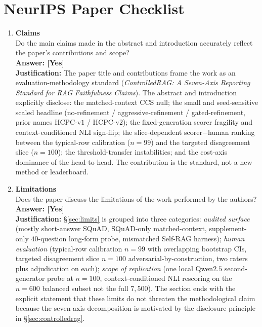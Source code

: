 %
%

\section*{NeurIPS Paper Checklist}

\begin{enumerate}

\item {\bf Claims}\\
Do the main claims made in the abstract and introduction accurately
reflect the paper's contributions and scope?
\\\textbf{Answer: [Yes]}
\\\textbf{Justification:} The paper title and contributions frame
the work as an evaluation-methodology standard
(\emph{ControlledRAG: A Seven-Axis Reporting Standard for RAG
Faithfulness Claims}). The abstract and introduction explicitly
disclose: the matched-context CCS null; the small and
seed-sensitive scaled headline (no-refinement /
aggressive-refinement / gated-refinement, prior names HCPC-v$1$ /
HCPC-v$2$); the fixed-generation scorer fragility and
context-conditioned NLI sign-flip; the slice-dependent
scorer$-$human ranking between the typical-row calibration
($n{=}99$) and the targeted disagreement slice ($n{=}100$); the
threshold-transfer instabilities; and the cost-axis dominance of
the head-to-head. The contribution is the standard, not a new
method or leaderboard.

\item {\bf Limitations}\\
Does the paper discuss the limitations of the work performed by the
authors?
\\\textbf{Answer: [Yes]}
\\\textbf{Justification:} \S\ref{sec:limits} is grouped into three
categories: \emph{audited surface} (mostly short-answer SQuAD,
SQuAD-only matched-context, supplement-only $40$-question long-form
probe, mismatched Self-RAG harness); \emph{human evaluation}
(typical-row calibration $n{=}99$ with overlapping bootstrap CIs,
targeted disagreement slice $n{=}100$ adversarial-by-construction,
two raters plus adjudication on each); \emph{scope of replication}
(one local Qwen$2.5$ second-generator probe at $n{=}100$,
context-conditioned NLI rescoring on the $n{=}600$ balanced subset
not the full $7{,}500$). The section ends with the explicit
statement that these limits do not threaten the methodological
claim because the seven-axis decomposition is motivated by the
disclosure principle in \S\ref{sec:controlledrag}.


\end{enumerate}
